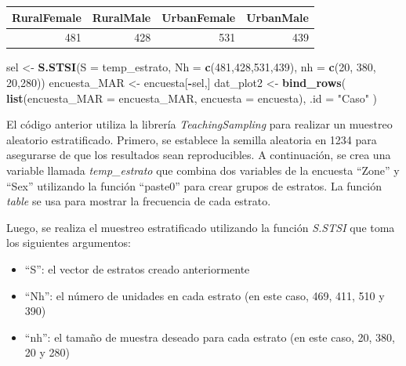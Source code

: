 \documentclass[
  spanish,
  12pt,
]{book}
\newenvironment{Shaded}{\begin{snugshade}}{\end{snugshade}}
\newcommand{\AttributeTok}[1]{\textcolor[rgb]{0.13,0.29,0.53}{#1}}
\newcommand{\DecValTok}[1]{\textcolor[rgb]{0.00,0.00,0.81}{#1}}
\newcommand{\FunctionTok}[1]{\textcolor[rgb]{0.13,0.29,0.53}{\textbf{#1}}}
\newcommand{\NormalTok}[1]{#1}
\newcommand{\OtherTok}[1]{\textcolor[rgb]{0.56,0.35,0.01}{#1}}
\newcommand{\SpecialCharTok}[1]{\textcolor[rgb]{0.81,0.36,0.00}{\textbf{#1}}}
\newcommand{\StringTok}[1]{\textcolor[rgb]{0.31,0.60,0.02}{#1}}
\providecommand{\tightlist}{%
  \setlength{\itemsep}{0pt}\setlength{\parskip}{0pt}}
\begin{document}
\begin{tabular}{r|r|r|r}
\hline
RuralFemale & RuralMale & UrbanFemale & UrbanMale\\
\hline
481 & 428 & 531 & 439\\
\hline
\end{tabular}

\begin{Shaded}
\begin{Highlighting}[]
\NormalTok{sel }\OtherTok{\textless{}{-}} \FunctionTok{S.STSI}\NormalTok{(}\AttributeTok{S =}\NormalTok{ temp\_estrato, }
              \AttributeTok{Nh =} \FunctionTok{c}\NormalTok{(}\DecValTok{481}\NormalTok{,}\DecValTok{428}\NormalTok{,}\DecValTok{531}\NormalTok{,}\DecValTok{439}\NormalTok{),}
              \AttributeTok{nh =} \FunctionTok{c}\NormalTok{(}\DecValTok{20}\NormalTok{, }\DecValTok{380}\NormalTok{, }\DecValTok{20}\NormalTok{,}\DecValTok{280}\NormalTok{))}
\NormalTok{encuesta\_MAR }\OtherTok{\textless{}{-}}\NormalTok{ encuesta[}\SpecialCharTok{{-}}\NormalTok{sel,]}
\NormalTok{dat\_plot2 }\OtherTok{\textless{}{-}} \FunctionTok{bind\_rows}\NormalTok{(}
  \FunctionTok{list}\NormalTok{(}\AttributeTok{encuesta\_MAR =}\NormalTok{ encuesta\_MAR,}
       \AttributeTok{encuesta =}\NormalTok{ encuesta), }\AttributeTok{.id =} \StringTok{"Caso"}\NormalTok{  )}
\end{Highlighting}
\end{Shaded}

El código anterior utiliza la librería \emph{TeachingSampling} para realizar un muestreo aleatorio estratificado. Primero, se establece la semilla aleatoria en 1234 para asegurarse de que los resultados sean reproducibles. A continuación, se crea una variable llamada \emph{temp\_estrato} que combina dos variables de la encuesta ``Zone'' y ``Sex'' utilizando la función ``paste0'' para crear grupos de estratos. La función \emph{table} se usa para mostrar la frecuencia de cada estrato.

Luego, se realiza el muestreo estratificado utilizando la función \emph{S.STSI} que toma los siguientes argumentos:

\begin{itemize}
\tightlist
\item
  ``S'': el vector de estratos creado anteriormente
\item
  ``Nh'': el número de unidades en cada estrato (en este caso, 469, 411, 510 y 390)
\item
  ``nh'': el tamaño de muestra deseado para cada estrato (en este caso, 20, 380, 20 y 280)
\end{itemize}
\end{document}
